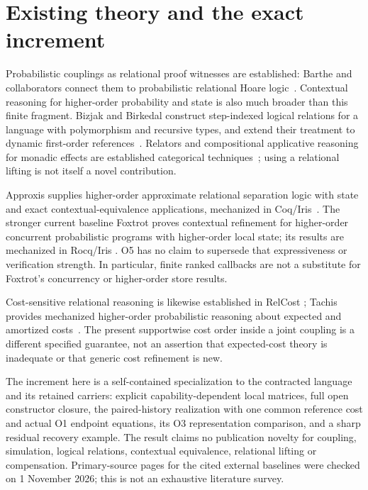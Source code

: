 \documentclass[11pt,a4paper]{article}
\theoremstyle{definition}
\begin{document}
\section{Existing theory and the exact increment}\label{sec:prior}
Probabilistic couplings as relational proof witnesses are established:
Barthe and collaborators connect them to probabilistic relational Hoare
logic~\cite{Coupling}. Contextual reasoning for higher-order probability
and state is also much broader than this finite fragment. Bizjak and
Birkedal construct step-indexed logical relations for a language with
polymorphism and recursive types, and extend their treatment to dynamic
first-order references~\cite{Bizjak}. Relators and compositional
applicative reasoning for monadic effects are established categorical
techniques~\cite{Relators}; using a relational lifting is not itself a
novel contribution.

Approxis supplies higher-order approximate relational separation logic
with state and exact contextual-equivalence applications, mechanized in
Coq/Iris~\cite{Approxis}. The stronger current baseline Foxtrot proves
contextual refinement for higher-order concurrent probabilistic programs
with higher-order local state; its results are mechanized in Rocq/Iris
\cite{Foxtrot}. O5 has no claim to supersede that expressiveness or
verification strength. In particular, finite ranked callbacks are not
a substitute for Foxtrot's concurrency or higher-order store results.

Cost-sensitive relational reasoning is likewise established in RelCost
\cite{RelCost}; Tachis provides mechanized higher-order probabilistic
reasoning about expected and amortized costs~\cite{Tachis}. The present
supportwise cost order inside a joint coupling is a different specified
guarantee, not an assertion that expected-cost theory is inadequate or
that generic cost refinement is new.

The increment here is a self-contained specialization to the contracted
language and its retained carriers: explicit capability-dependent local
matrices, full open constructor closure, the paired-history realization
with one common reference cost and actual O1 endpoint equations, its
O3 representation comparison, and a sharp residual recovery example.
The result claims no publication novelty for coupling, simulation,
logical relations, contextual equivalence, relational lifting or
compensation. Primary-source pages for the cited external baselines were
checked on 1 November 2026; this is not an exhaustive literature survey.
\end{document}
